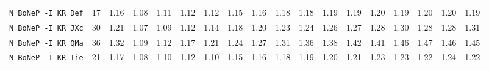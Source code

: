 \begin{tabular}{l | r r | r r r r r r r r r r r r r r r |}
\verb+N BoNeP -I KR Def+ & 17 & 1.16 & 1.08&1.11&1.12&1.12&1.15&1.16&1.18&1.18&1.19&1.19&1.20&1.19&1.20&1.20&1.19\\
\verb+N BoNeP -I KR JXc+ & 30 & 1.21 & 1.07&1.09&1.12&1.14&1.18&1.20&1.23&1.24&1.26&1.27&1.28&1.30&1.28&1.28&1.31\\
\verb+N BoNeP -I KR QMa+ & 36 & 1.32 & 1.09&1.12&1.17&1.21&1.24&1.27&1.31&1.36&1.38&1.42&1.41&1.46&1.47&1.46&1.45\\
\verb+N BoNeP -I KR Tie+ & 21 & 1.17 & 1.08&1.10&1.12&1.10&1.15&1.16&1.18&1.19&1.20&1.21&1.23&1.23&1.22&1.24&1.22\\
\end{tabular}
